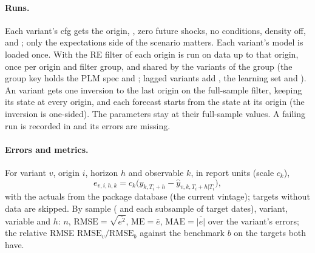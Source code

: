 \documentclass[11pt,a4paper]{article}
\begin{document}
\paragraph{Runs.} Each variant's cfg gets the origin, , zero
future shocks, no conditions, density off,  and
; only the expectations side of the scenario matters. Each
variant's model is loaded once. With  the RE filter of each origin is run on data
up to that origin, once per origin and filter group, and shared by the variants of the group (the
group key holds the PLM spec and ; lagged variants add , the
learning set and ). An  variant gets one inversion to the last
origin on the full-sample filter, keeping its state at every origin, and each forecast starts from
the state at its origin (the inversion is one-sided). The parameters stay at their full-sample
values. A failing run is recorded in  and its errors are missing.

\paragraph{Errors and metrics.} For variant $v$, origin $i$, horizon $h$ and observable $k$, in report
units (scale $c_k$),
\begin{equation}
  e_{v,i,h,k} = c_k\bigl(y_{k,T_i+h} - \hat y_{v,k,T_i+h|T_i}\bigr),
\end{equation}
with the actuals from the package database (the current vintage); targets without data are skipped.
By sample ( and each subsample of target dates), variant, variable and $h$: $n$,
$\mathrm{RMSE} = \sqrt{\overline{e^2}}$, $\mathrm{ME} = \bar e$, $\mathrm{MAE} = \overline{|e|}$ over the
variant's errors; the relative RMSE $\mathrm{RMSE}_v/\mathrm{RMSE}_b$ against the benchmark $b$ on
the targets both have.
\end{document}
